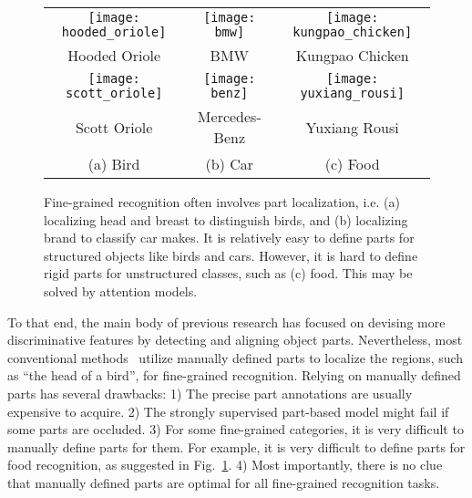 \documentclass[10pt,twocolumn,letterpaper]{article}
\begin{document}
\setlength{\tabcolsep}{0.5pt}
\begin{figure}[t]
\begin{center}
\begin{tabular}{ccc}
\texttt{[image: hooded\_oriole]} &
\texttt{[image: bmw]} &
\texttt{[image: kungpao\_chicken]} \\
\vspace{2pt}
Hooded Oriole & BMW & Kungpao Chicken \\
\texttt{[image: scott\_oriole]} &
\texttt{[image: benz]} &
\texttt{[image: yuxiang\_rousi]} \\
Scott Oriole & Mercedes-Benz & Yuxiang Rousi \\
(a) Bird & (b) Car & (c) Food
\end{tabular}
\end{center}
\caption{Fine-grained recognition often involves part localization, i.e. (a) localizing head and breast to distinguish birds, and (b) localizing brand to classify car makes.
It is relatively easy to define parts for structured objects like birds and cars.
However, it is hard to define rigid parts for unstructured classes, such as (c) food.
This may be solved by attention models.
}
\label{fig:teaser2}
\end{figure}

To that end, the main body of previous research has focused on devising more discriminative features by detecting and aligning object parts.
Nevertheless, most conventional methods~\cite{liu2012dog, branson2014bird} utilize manually defined parts to localize the regions, such as ``the head of a bird'', for fine-grained recognition.
Relying on manually defined parts has several drawbacks:
1) The precise part annotations are usually expensive to acquire.
2) The strongly supervised part-based model might fail if some parts are occluded.
3) For some fine-grained categories, it is very difficult to manually define parts for them.
For example, it is very difficult to define parts for food recognition, as suggested in Fig.~\ref{fig:teaser2}.
4) Most importantly, there is no clue that manually defined parts are optimal for all fine-grained recognition tasks.
\end{document}
